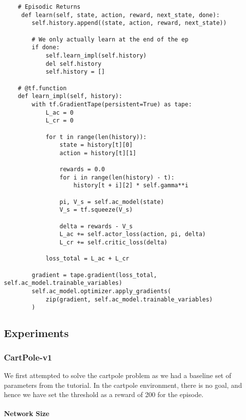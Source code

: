 \documentclass[A4]{article}
\begin{document}
    \begin{verbatim}
    # Episodic Returns
     def learn(self, state, action, reward, next_state, done):
        self.history.append((state, action, reward, next_state))

        # We only actually learn at the end of the ep
        if done:
            self.learn_impl(self.history)
            del self.history
            self.history = []

    # @tf.function
    def learn_impl(self, history):
        with tf.GradientTape(persistent=True) as tape:
            L_ac = 0
            L_cr = 0

            for t in range(len(history)):
                state = history[t][0]
                action = history[t][1]

                rewards = 0.0
                for i in range(len(history) - t):
                    history[t + i][2] * self.gamma**i

                pi, V_s = self.ac_model(state)
                V_s = tf.squeeze(V_s)

                delta = rewards - V_s
                L_ac += self.actor_loss(action, pi, delta)
                L_cr += self.critic_loss(delta)

            loss_total = L_ac + L_cr

        gradient = tape.gradient(loss_total, self.ac_model.trainable_variables)
        self.ac_model.optimizer.apply_gradients(
            zip(gradient, self.ac_model.trainable_variables)
        )
    \end{verbatim}

    \subsection{Experiments}\label{subsec:results}

    \subsubsection{CartPole-v1}
    We first attempted to solve the cartpole problem as we had a baseline set of parameters from the tutorial.
    In the cartpole environment, there is no goal, and hence we have set the threshold as a reward of 200 for the episode.

    \paragraph{Network Size}
\end{document}
